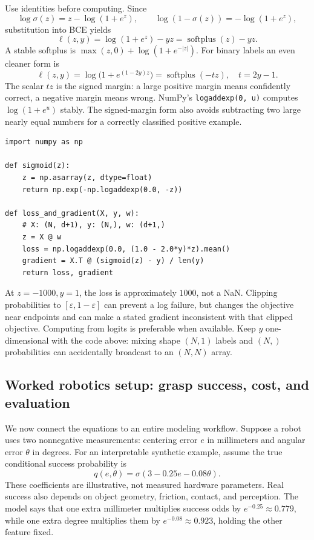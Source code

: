 Use identities before computing. Since
\[
\log\sigma(z)=z-\log(1+e^z),\qquad
\log(1-\sigma(z))=-\log(1+e^z),
\]
substitution into BCE yields
\begin{equation}
\ell(z,y)=\log(1+e^z)-yz
=\operatorname{softplus}(z)-yz.
\label{eq:lr11-softplus}
\end{equation}
A stable softplus is
$\max(z,0)+\log(1+e^{-|z|})$. For binary labels an even cleaner form is
\[
\boxed{\ell(z,y)=\log\bigl(1+e^{(1-2y)z}\bigr)
=\operatorname{softplus}(-t z),\quad t=2y-1.}
\]
The scalar $tz$ is the signed margin: a large positive margin means confidently
correct, a negative margin means wrong. NumPy's \texttt{logaddexp(0, u)} computes
$\log(1+e^u)$ stably. The signed-margin form also avoids subtracting two large
nearly equal numbers for a correctly classified positive example.

\begin{lstlisting}
import numpy as np

def sigmoid(z):
    z = np.asarray(z, dtype=float)
    return np.exp(-np.logaddexp(0.0, -z))

def loss_and_gradient(X, y, w):
    # X: (N, d+1), y: (N,), w: (d+1,)
    z = X @ w
    loss = np.logaddexp(0.0, (1.0 - 2.0*y)*z).mean()
    gradient = X.T @ (sigmoid(z) - y) / len(y)
    return loss, gradient
\end{lstlisting}

At $z=-1000,y=1$, the loss is approximately $1000$, not a NaN. Clipping
probabilities to $[\varepsilon,1-\varepsilon]$ can prevent a log failure, but
changes the objective near endpoints and can make a stated gradient inconsistent
with that clipped objective. Computing from logits is preferable when available.
Keep $y$ one-dimensional with the code above: mixing shape $(N,1)$ labels and
$(N,)$ probabilities can accidentally broadcast to an $(N,N)$ array.

\subsection{Worked robotics setup: grasp success, cost, and evaluation}
We now connect the equations to an entire modeling workflow. Suppose a robot
uses two nonnegative measurements: centering error $e$ in millimeters and angular
error $\theta$ in degrees. For an interpretable synthetic example, assume the
true conditional success probability is
\begin{equation}
q(e,\theta)=\sigma(3-0.25e-0.08\theta).
\label{eq:lr11-robot}
\end{equation}
These coefficients are illustrative, not measured hardware parameters. Real
success also depends on object geometry, friction, contact, and perception.
The model says that one extra millimeter multiplies success odds by
$e^{-0.25}\approx0.779$, while one extra degree multiplies them by
$e^{-0.08}\approx0.923$, holding the other feature fixed.

